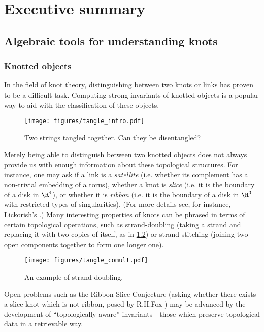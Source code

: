 \chapter{Executive summary}
\label{ch:summary}

\section{Algebraic tools for understanding knots}
\subsection{Knotted objects}
In the field of knot theory, distinguishing between two knots or links
has proven to be a difficult task. Computing strong invariants of knotted
objects is a popular way to aid with the classification of these objects.
\begin{figure}[h]
        \centering
        \texttt{[image: figures/tangle\_intro.pdf]}
        \caption{Two strings tangled together. Can they be disentangled?}
        \label{fig:unknot}
\end{figure}

Merely being able to distinguish between two knotted objects does not always
provide us with enough information about these topological structures. For
instance, one may ask if a link is a \emph{satellite} (i.e. whether its
complement has a non-trivial embedding of a torus), whether a knot is
\emph{slice} (i.e. it is the boundary of a disk in $\R^4$), or whether it is
\emph{ribbon} (i.e. it is the boundary of a disk in $\R^3$ with restricted types
of singularities). (For more details see, for instance, Lickorish's
\cite{lickorish}.) Many interesting properties of knots can be phrased in terms
of certain topological operations, such as strand-doubling (taking a strand and
replacing it with two copies of itself, as in \cref{fig:strand_double}) or
strand-stitching (joining two open components together to form one longer one).

\begin{figure}[h]
        \centering
        \texttt{[image: figures/tangle\_comult.pdf]}
        \caption{An example of strand-doubling.}
        \label{fig:strand_double}
\end{figure}

Open problems such as the Ribbon Slice Conjecture (asking whether there exists a
slice knot which is not ribbon, posed by R.\@ H.\@ Fox \cite{fox}) may be
advanced by the development of \enquote{topologically aware} invariants---those
which preserve topological data in a retrievable way.


